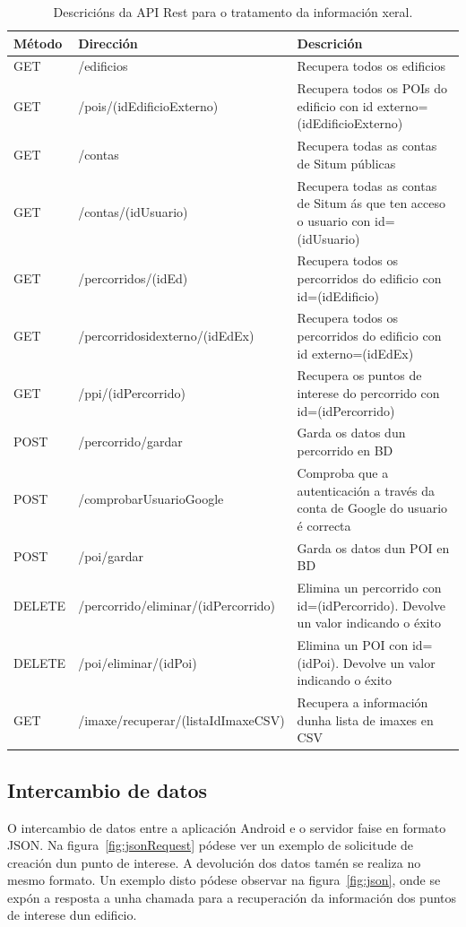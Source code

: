 \begin{table} [!h]
	\footnotesize
	\centering
	\begin{tabular}{|l|p{6cm}|p{6cm}|}
		\hline 
		\textbf{Método}	& \textbf{Dirección} & \textbf{Descrición} \\ 
		\hline 
		GET & /edificios & Recupera todos os edificios \\ 
		\hline 
		GET & /pois/(idEdificioExterno) & Recupera todos os POIs do edificio con id externo=(idEdificioExterno) \\ 
		\hline 
		GET & /contas & Recupera todas as contas de Situm públicas \\ 
		\hline 
		GET & /contas/(idUsuario) & Recupera todas as contas de Situm ás que ten acceso o usuario con id=(idUsuario) \\ 
		\hline 
		GET & /percorridos/(idEd) & Recupera todos os percorridos do edificio con id=(idEdificio) \\ 
		\hline 
		GET & /percorridosidexterno/(idEdEx) & Recupera todos os percorridos do edificio con id externo=(idEdEx) \\ 
		\hline 
		GET & /ppi/(idPercorrido) & Recupera os puntos de interese do percorrido con id=(idPercorrido) \\ 
		\hline 
		POST & /percorrido/gardar & Garda os datos dun percorrido en BD \\ 
		\hline 
		POST & /comprobarUsuarioGoogle & Comproba que a autenticación a través da conta de Google do usuario é correcta \\ 
		\hline 
		POST & /poi/gardar & Garda os datos dun POI en BD \\ 
		\hline 
		DELETE & /percorrido/eliminar/(idPercorrido) & Elimina un percorrido con id=(idPercorrido). Devolve un valor indicando o éxito \\ 
		\hline 
		DELETE & /poi/eliminar/(idPoi) & Elimina un POI con id=(idPoi). Devolve un valor indicando o éxito \\ 
		\hline 
		GET & /imaxe/recuperar/(listaIdImaxeCSV) & Recupera a información dunha lista de imaxes en CSV \\ 
		\hline 
	\end{tabular}
	\caption{Descricións da API Rest para o tratamento da información xeral.}
	\label{tab:APIXeral}
\end{table}

\subsection{Intercambio de datos}
O intercambio de datos entre a aplicación Android e o servidor faise en formato JSON. Na figura~\ref{fig:jsonRequest} pódese ver un exemplo de solicitude de creación dun punto de interese. A devolución dos datos tamén se realiza no mesmo formato. Un exemplo disto pódese observar na figura~\ref{fig:json}, onde se expón a resposta a unha chamada para a recuperación da información dos puntos de interese dun edificio.

